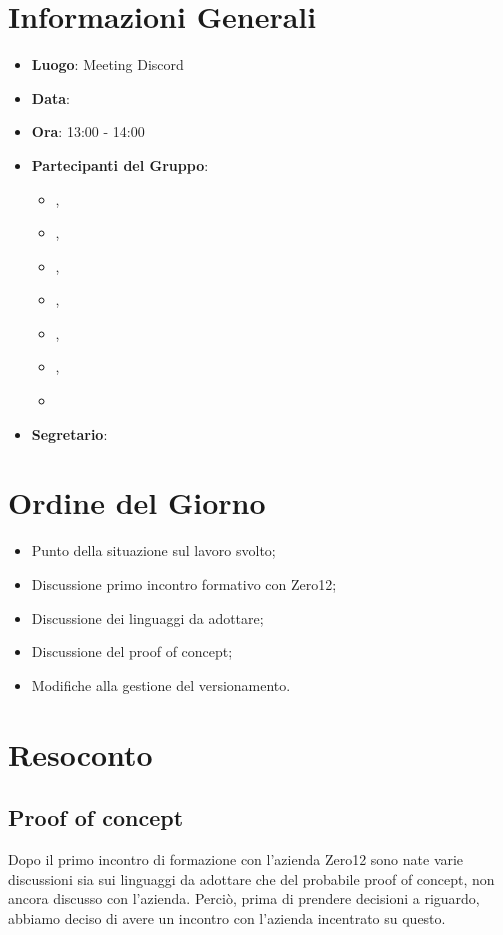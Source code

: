 \section{Informazioni Generali}

\begin{itemize}
\item{\textbf{Luogo}}: Meeting Discord
\item{\textbf{Data}}: \D{}
\item{\textbf{Ora}}: 13:00 - 14:00
\item{\textbf{Partecipanti del Gruppo}}: 
	\begin{itemize}
	\item{\EP{},} 
	\item{\FP{},}
	\item{\GC{},}
	\item{\LW{},}
	\item{\MB{},}
	\item{\MG{},}
	\item{\PV{}}
	\end{itemize} 
\item{\textbf{Segretario}}: \PV{}	
\end{itemize}

\section{Ordine del Giorno}
\begin{itemize}
\item{Punto della situazione sul lavoro svolto;}
\item{Discussione primo incontro formativo con Zero12;}
\item{Discussione dei linguaggi da adottare;}
\item{Discussione del proof of concept;}
\item{Modifiche alla gestione del versionamento.}
\end{itemize}

\section{Resoconto}

\subsection{Proof of concept}
Dopo il primo incontro di formazione con l'azienda Zero12 sono nate varie discussioni sia sui linguaggi da adottare che del probabile proof of concept, non ancora discusso con l'azienda. Perciò, prima di prendere decisioni a riguardo, abbiamo deciso di avere un incontro con l'azienda incentrato su questo.


